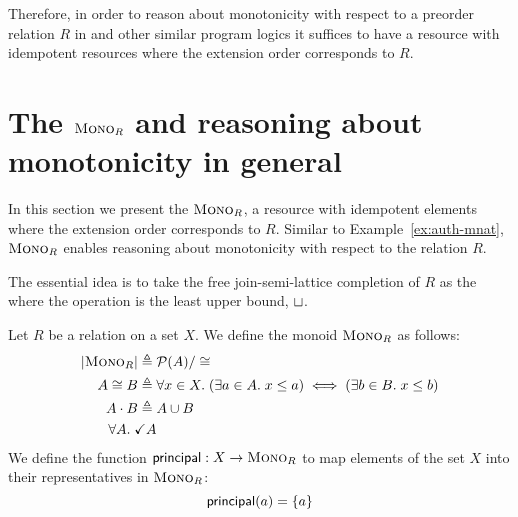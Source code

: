 \documentclass{scrartcl}
\begin{document}
Therefore, in order to reason about monotonicity with respect to a
preorder relation $R$ in \Iris{} and other similar program logics it
suffices to have a resource with idempotent resources where the
extension order corresponds to $R$.

\section{The $\textsc{Mono}_{R}$ \PCM{} and reasoning about monotonicity in
  general}
In this section we present the \PCM{} $\textsc{Mono}_{R}$, a resource with
idempotent elements where the extension order corresponds to
$R$. Similar to Example~\ref{ex:auth-mnat}, $\textsc{Mono}_{R}$ enables
reasoning about monotonicity with respect to the relation $R$.

The essential idea is to take the free join-semi-lattice completion of
$R$ as the \PCM{} where the operation is the least upper bound,
$\sqcup$.

\begin{definition}
  Let $R$ be a relation on a set $X$. We define the monoid $\textsc{Mono}_{R}$
  as follows:
\begin{align*}
  |\textsc{Mono}_{R}| \triangleq{}& \mathcal{P}(A)/\cong\\
  A \cong B \triangleq{}& \forall x \in X.\; (\exists a \in A.\; x \le a) \iff (\exists b \in B.\; x \le b)\\
  A \cdot B \triangleq{} & A \cup B\\
  \forall A.\; \checkmark{A}
\end{align*}
We define the function $\mathsf{principal} : X \to \textsc{Mono}_{R}$ to map elements
of the set $X$ into their representatives in $\textsc{Mono}_{R}$:
\[ \mathsf{principal}(a) = \left\{a\right\} \]
\end{definition}
\end{document}
